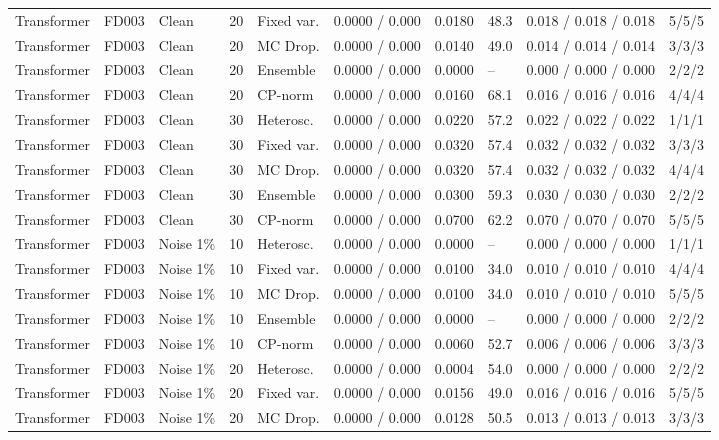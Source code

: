 \documentclass[10pt,a4paper]{article}
\begin{document}
\begin{landscape}
\begin{center}
\begin{longtable}{lllllcclll}
Transformer & FD003 & Clean & 20 & Fixed var. & 0.0000 / 0.000 & 0.0180 & 48.3 & 0.018 / 0.018 / 0.018 & 5/5/5 \\
Transformer & FD003 & Clean & 20 & MC Drop. & 0.0000 / 0.000 & 0.0140 & 49.0 & 0.014 / 0.014 / 0.014 & 3/3/3 \\
Transformer & FD003 & Clean & 20 & Ensemble & 0.0000 / 0.000 & 0.0000 & -- & 0.000 / 0.000 / 0.000 & 2/2/2 \\
Transformer & FD003 & Clean & 20 & CP-norm & 0.0000 / 0.000 & 0.0160 & 68.1 & 0.016 / 0.016 / 0.016 & 4/4/4 \\
Transformer & FD003 & Clean & 30 & Heterosc. & 0.0000 / 0.000 & 0.0220 & 57.2 & 0.022 / 0.022 / 0.022 & 1/1/1 \\
Transformer & FD003 & Clean & 30 & Fixed var. & 0.0000 / 0.000 & 0.0320 & 57.4 & 0.032 / 0.032 / 0.032 & 3/3/3 \\
Transformer & FD003 & Clean & 30 & MC Drop. & 0.0000 / 0.000 & 0.0320 & 57.4 & 0.032 / 0.032 / 0.032 & 4/4/4 \\
Transformer & FD003 & Clean & 30 & Ensemble & 0.0000 / 0.000 & 0.0300 & 59.3 & 0.030 / 0.030 / 0.030 & 2/2/2 \\
Transformer & FD003 & Clean & 30 & CP-norm & 0.0000 / 0.000 & 0.0700 & 62.2 & 0.070 / 0.070 / 0.070 & 5/5/5 \\
Transformer & FD003 & Noise 1\% & 10 & Heterosc. & 0.0000 / 0.000 & 0.0000 & -- & 0.000 / 0.000 / 0.000 & 1/1/1 \\
Transformer & FD003 & Noise 1\% & 10 & Fixed var. & 0.0000 / 0.000 & 0.0100 & 34.0 & 0.010 / 0.010 / 0.010 & 4/4/4 \\
Transformer & FD003 & Noise 1\% & 10 & MC Drop. & 0.0000 / 0.000 & 0.0100 & 34.0 & 0.010 / 0.010 / 0.010 & 5/5/5 \\
Transformer & FD003 & Noise 1\% & 10 & Ensemble & 0.0000 / 0.000 & 0.0000 & -- & 0.000 / 0.000 / 0.000 & 2/2/2 \\
Transformer & FD003 & Noise 1\% & 10 & CP-norm & 0.0000 / 0.000 & 0.0060 & 52.7 & 0.006 / 0.006 / 0.006 & 3/3/3 \\
Transformer & FD003 & Noise 1\% & 20 & Heterosc. & 0.0000 / 0.000 & 0.0004 & 54.0 & 0.000 / 0.000 / 0.000 & 2/2/2 \\
Transformer & FD003 & Noise 1\% & 20 & Fixed var. & 0.0000 / 0.000 & 0.0156 & 49.0 & 0.016 / 0.016 / 0.016 & 5/5/5 \\
Transformer & FD003 & Noise 1\% & 20 & MC Drop. & 0.0000 / 0.000 & 0.0128 & 50.5 & 0.013 / 0.013 / 0.013 & 3/3/3 \\

\end{longtable}
\end{center}
\end{landscape}
\end{document}
